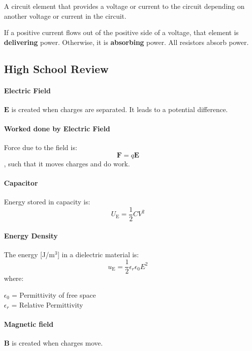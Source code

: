\documentclass[11pt]{article}
\begin{document}
    \begin{definition}
    A circuit element that provides a voltage or current to the circuit depending on another voltage or current in the circuit.
    \end{definition}
    
    \begin{definition}
    If a positive current flows out of the positive side of a voltage, that element is \textbf{delivering} power. Otherwise, it is \textbf{absorbing} power. All resistors absorb power.
    \end{definition}
\subsection{High School Review}
\paragraph{Electric Field} $\textbf{E}$ is created when charges are separated. It leads to a potential difference.
\paragraph{Worked done by Electric Field} Force due to the field is:
\begin{equation}
    \textbf{F} = q\textbf{E}
\end{equation}
, such that it moves charges and do work.
\paragraph{Capacitor} Energy stored in capacity is:
\begin{equation}
    U_\text{E} = \frac{1}{2}CV^2
\end{equation}
\paragraph{Energy Density} The energy [J/m$^3$] in a dielectric material is:
\begin{equation}
    u_\text{E} = \frac{1}{2}\epsilon_r \epsilon_0 E^2
\end{equation}
where:
\begin{center}
    $\epsilon_0$ = Permittivity of free space \\
    $\epsilon_r$ = Relative Permittivity
\end{center}
\paragraph{Magnetic field} \textbf{B} is created when charges move.
\end{document}
